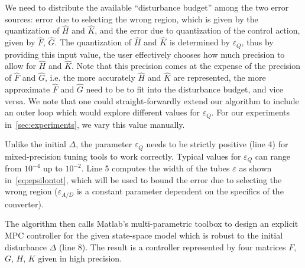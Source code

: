 We need to distribute the available ``disturbance budget'' among the two error
sources: error due to selecting the wrong region, which is given by the
quantization of $\hat{H}$ and $\hat{K}$, and the error due to
quantization of the control action, given by $\hat{F}$, $\hat{G}$.
The quantization of $\hat{H}$ and $\hat{K}$ is determined by
$\varepsilon_Q$, thus by providing this input value, the user effectively
chooses how much precision to allow for $\hat{H}$ and $\hat{K}$.
Note that this precision comes at the expense of the precision of
$\hat{F}$ and $\hat{G}$, i.e. the more accurately $\hat{H}$
and $\hat{K}$ are represented, the more approximate $\hat{F}$ and
$\hat{G}$ need to be to fit into the disturbance budget, and vice versa.
We note that one could straight-forwardly extend our algorithm to include an
outer loop which would explore different values for $\varepsilon_Q$. For our
experiments in~\autoref{sec:experiments}, we vary this value manually.



Unlike the initial $\Delta$, the parameter $\varepsilon_Q$ needs to be strictly positive (line 4)
for mixed-precision tuning tools to work correctly. 
Typical values for $\varepsilon_Q$ can range from $10^{-4}$ up to $10^{-2}$. 
Line 5 computes the width of the tubes $\varepsilon$ as shown in~\autoref{eq:epsilontot},
which will be used to bound the error due to selecting the wrong region
($\varepsilon_{A/D}$ is a constant parameter dependent on the specifics of the
converter).

The algorithm then calls Matlab's multi-parametric toolbox to design an explicit
MPC controller for the given state-space model which is robust to the initial
disturbance $\Delta$ (line 8). The result is a controller represented by four matrices
$F$, $G$, $H$, $K$ given in high precision.

